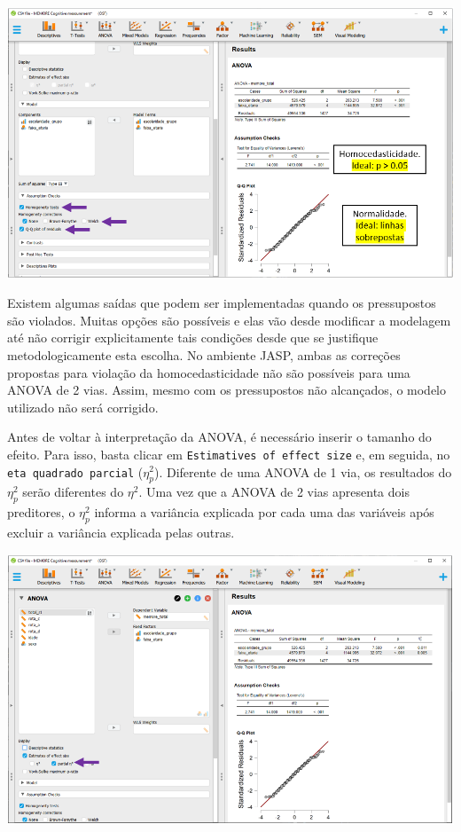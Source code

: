 \documentclass[
]{book}
\begin{document}
\includegraphics{./img/cap_anova_two_way_pressupostos2.png}

Existem algumas saídas que podem ser implementadas quando os pressupostos são violados. Muitas opções são possíveis e elas vão desde modificar a modelagem até não corrigir explicitamente tais condições desde que se justifique metodologicamente esta escolha. No ambiente JASP, ambas as correções propostas para violação da homocedasticidade não são possíveis para uma ANOVA de 2 vias. Assim, mesmo com os pressupostos não alcançados, o modelo utilizado não será corrigido.

Antes de voltar à interpretação da ANOVA, é necessário inserir o tamanho do efeito. Para isso, basta clicar em \texttt{Estimatives\ of\ effect\ size} e, em seguida, no \texttt{eta\ quadrado\ parcial} (\(η_p^2\)). Diferente de uma ANOVA de 1 via, os resultados do \(η_p^2\) serão diferentes do \(η^2\). Uma vez que a ANOVA de 2 vias apresenta dois preditores, o \(η_p^2\) informa a variância explicada por cada uma das variáveis após excluir a variância explicada pelas outras.

\includegraphics{./img/cap_anova_two_way_tamanho_do_efeito.png}
\end{document}
